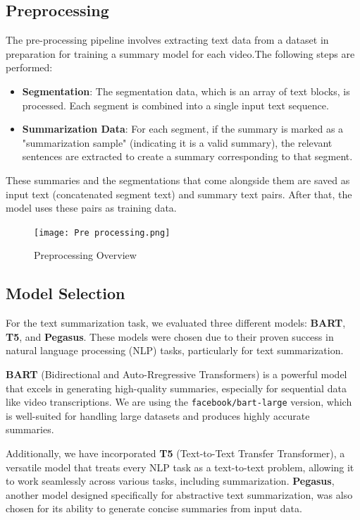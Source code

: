 \documentclass[conference]{IEEEtran}
\begin{document}
\subsection{Preprocessing}
The pre-processing pipeline involves extracting text data from a dataset in preparation for training a summary model for each video.The following steps are performed:

\begin{itemize}
    \item \textbf{Segmentation}: The segmentation data, which is an array of text blocks, is processed. Each segment is combined into a single input text sequence.
    \item \textbf{Summarization Data}: For each segment, if the summary is marked as a "summarization sample" (indicating it is a valid summary), the relevant sentences are extracted to create a summary corresponding to that segment.
\end{itemize}

These summaries and the segmentations that come alongside them are saved as input text (concatenated segment text) and summary text pairs. After that, the model uses these pairs as training data.

\begin{figure}[htp]
    \centering
    \texttt{[image: Pre processing.png]} 
    \caption{Preprocessing Overview}
    \label{fig:preprocessing}
\end{figure}




\subsection{Model Selection}

For the text summarization task, we evaluated three different models: \textbf{BART}, \textbf{T5}, and \textbf{Pegasus}. These models were chosen due to their proven success in natural language processing (NLP) tasks, particularly for text summarization.

\textbf{BART} (Bidirectional and Auto-Rregressive Transformers) is a powerful model that excels in generating high-quality summaries, especially for sequential data like video transcriptions. We are using the \texttt{facebook/bart-large} version, which is well-suited for handling large datasets and produces highly accurate summaries.

Additionally, we have incorporated \textbf{T5} (Text-to-Text Transfer Transformer), a versatile model that treats every NLP task as a text-to-text problem, allowing it to work seamlessly across various tasks, including summarization. \textbf{Pegasus}, another model designed specifically for abstractive text summarization, was also chosen for its ability to generate concise summaries from input data.
\end{document}

